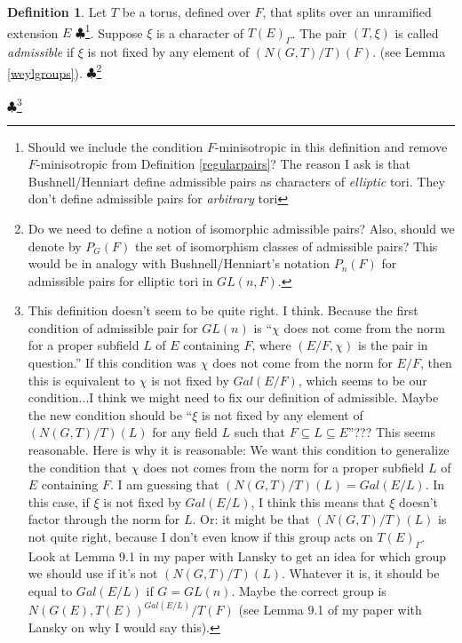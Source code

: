 \documentclass[11pt]{amsart}
\theoremstyle{plain}
\newcommand{\MAxxx}[1]{$\clubsuit$\footnote{#1}}
\theoremstyle{definition}
\newtheorem{definition}[theorem]{Definition}
\begin{document}
\begin{definition}\label{admissibledefinition}
Let $T$ be a torus, defined over $F$, that splits over an unramified
  extension $E$ \MAxxx{Should we include the condition $F$-minisotropic
  in this definition and remove $F$-minisotropic from Definition \ref{regularpairs}?
  The reason I ask is that Bushnell/Henniart define admissible pairs as characters
  of \emph{elliptic} tori.  They don't define admissible pairs for \emph{arbitrary}
  tori}.  Suppose $\xi$ is a character of $T(E)_{\Gamma}$.
The pair $(T, \xi)$ is called \emph{admissible} if $\xi$ is not fixed
by any element of $(N(G,T)/T)(F)$. (see Lemma \ref{weylgroups}). \MAxxx{Do we need
to define a notion of isomorphic admissible pairs?  Also, should we
denote by $P_G(F)$ the set of isomorphism classes of admissible pairs?  This
would be in analogy with Bushnell/Henniart's notation $P_n(F)$ for admissible
pairs for elliptic tori in $GL(n,F)$.}
\end{definition}\MAxxx{This definition doesn't seem to be quite right.  I think.
Because the first condition of admissible pair for $GL(n)$ is ``$\chi$ does not
come from the norm for a proper subfield $L$ of $E$ containing $F$, where
$(E/F, \chi)$ is the pair in question.'' If this condition was $\chi$ does not
come from the norm for $E/F$, then this is equivalent to $\chi$ is not fixed by
$Gal(E/F)$, which seems to be our condition...I think we might need to fix our
definition of admissible. Maybe the new condition should be ``$\xi$ is not
fixed by any element of $(N(G,T)/T)(L)$ for any field $L$ such that
$F \subseteq L \subseteq E$''???  This seems reasonable.  Here is why it is
reasonable: We want this condition to generalize the condition that $\chi$
does not comes from the norm for a proper subfield $L$ of $E$ containing $F$.
I am guessing that $(N(G,T)/T)(L) = Gal(E/L)$.  In this case, if $\xi$
is not fixed by $Gal(E/L)$, I think this means that $\xi$ doesn't factor
through the norm for $L$.  Or: it might be that $(N(G,T)/T)(L)$ is not quite
right, because I don't even know if this group acts on $T(E)_{\Gamma}$.  Look
at Lemma 9.1 in my paper with Lansky to get an idea for which group we should
use if it's not $(N(G,T)/T)(L)$.  Whatever it is, it should be equal to
$Gal(E/L)$ if $G = GL(n)$.  Maybe the correct group is
$N(G(E),T(E))^{Gal(E/L)} / T(F)$  (see Lemma 9.1 of my paper with Lansky on
why I would say this).}
\end{document}
